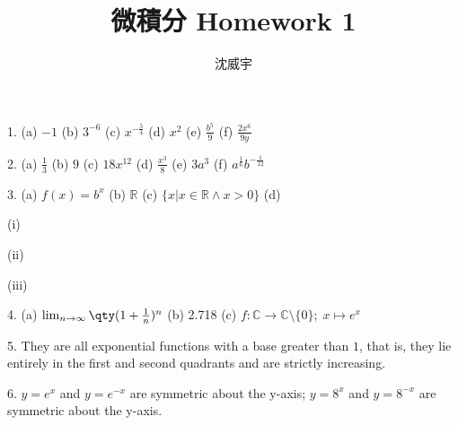 \documentclass[a4paper,12pt]{article}
\begin{document}
\title{微積分 Homework 1}
\author{沈威宇}
\date{\temtoday}
\titledoc
{}
1. (a) $-1$ (b) $3^{-6}$ (c) $x^{-\frac{5}{4}}$ (d) $x^2$ (e) $\frac{b^5}{9}$ (f) $\frac{2x^6}{9y}$

2. (a) $\frac{1}{3}$ (b) $9$ (c) $18x^{12}$ (d) $\frac{x^3}{8}$ (e) $3a^3$ (f) $a^{\frac{1}{6}}b^{-\frac{1}{12}}$

3. (a) $f(x)=b^x$ (b) $\mathbb{R}$ (c) $\{x|x\in\mathbb{R}\land x>0\}$ (d)

(i)
\begin{center}
\end{center}

(ii)
\begin{center}
\end{center}

(iii)
\begin{center}
\end{center}

4. (a) $\lim_{n\to\infty}\qty(1+\frac{1}{n})^n$ (b) 2.718 (c) $f\colon\mathbb{C}\to\mathbb{C}\setminus\{0\};\;x\mapsto e^x$

5. They are all exponential functions with a base greater than $1$, that is, they lie entirely in the first and second quadrants and are strictly increasing.

6. $y=e^x$ and $y=e^{-x}$ are symmetric about the y-axis; $y=8^x$ and $y=8^{-x}$ are symmetric about the y-axis.
\end{document}
